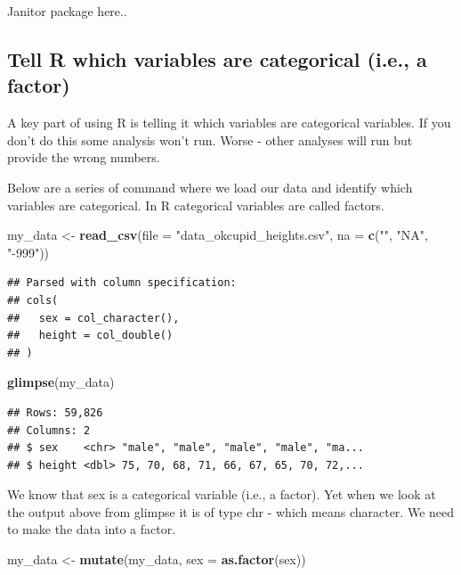 \documentclass[
]{krantz}
\makeatletter
\newenvironment{Shaded}{\begin{snugshade}}{\end{snugshade}}
\newcommand{\DataTypeTok}[1]{\textcolor[rgb]{0.27,0.27,0.27}{#1}}
\newcommand{\KeywordTok}[1]{\textcolor[rgb]{0.27,0.27,0.27}{\textbf{#1}}}
\newcommand{\NormalTok}[1]{#1}
\newcommand{\StringTok}[1]{\textcolor[rgb]{0.5,0.5,0.5}{#1}}
\newenvironment{kframe}{%
\medskip{}
\setlength{\fboxsep}{.8em}
 \def\at@end@of@kframe{}%
 \ifinner\ifhmode%
  \def\at@end@of@kframe{\end{minipage}}%
  \begin{minipage}{\columnwidth}%
 \fi\fi%
 \def\FrameCommand##1{\hskip\@totalleftmargin \hskip-\fboxsep
 \colorbox{shadecolor}{##1}\hskip-\fboxsep
     \hskip-\linewidth \hskip-\@totalleftmargin \hskip\columnwidth}%
 \MakeFramed {\advance\hsize-\width
   \@totalleftmargin\z@ \linewidth\hsize
   \@setminipage}}%
 {\par\unskip\endMakeFramed%
 \at@end@of@kframe}
\renewenvironment{Shaded}{\begin{kframe}}{\end{kframe}}
\makeatother
\begin{document}
Janitor package here..

\hypertarget{tell-r-which-variables-are-categorical-i.e.-a-factor}{%
\subsection{Tell R which variables are categorical (i.e., a factor)}\label{tell-r-which-variables-are-categorical-i.e.-a-factor}}

A key part of using R is telling it which variables are categorical variables. If you don't do this some analysis won't run. Worse - other analyses will run but provide the wrong numbers.

Below are a series of command where we load our data and identify which variables are categorical. In R categorical variables are called factors.

\begin{Shaded}
\begin{Highlighting}[]
\NormalTok{my_data <-}\StringTok{ }\KeywordTok{read_csv}\NormalTok{(}\DataTypeTok{file =} \StringTok{"data_okcupid_heights.csv"}\NormalTok{, }
                    \DataTypeTok{na =} \KeywordTok{c}\NormalTok{(}\StringTok{""}\NormalTok{, }\StringTok{"NA"}\NormalTok{, }\StringTok{"-999"}\NormalTok{))}
\end{Highlighting}
\end{Shaded}

\begin{verbatim}
## Parsed with column specification:
## cols(
##   sex = col_character(),
##   height = col_double()
## )
\end{verbatim}

\begin{Shaded}
\begin{Highlighting}[]
\KeywordTok{glimpse}\NormalTok{(my_data)}
\end{Highlighting}
\end{Shaded}

\begin{verbatim}
## Rows: 59,826
## Columns: 2
## $ sex    <chr> "male", "male", "male", "male", "ma...
## $ height <dbl> 75, 70, 68, 71, 66, 67, 65, 70, 72,...
\end{verbatim}

We know that sex is a categorical variable (i.e., a factor). Yet when we look at the output above from glimpse it is of type chr - which means character. We need to make the data into a factor.

\begin{Shaded}
\begin{Highlighting}[]
\NormalTok{my_data <-}\StringTok{ }\KeywordTok{mutate}\NormalTok{(my_data, }\DataTypeTok{sex =} \KeywordTok{as.factor}\NormalTok{(sex))}
\end{Highlighting}
\end{Shaded}
\end{document}
